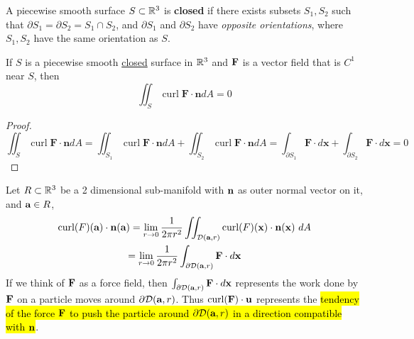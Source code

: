 \documentclass[11pt]{article}
\newcommand{\veF}[0]{\ve{F}}
\begin{document}
			\begin{definition}
				A piecewise smooth surface $S \subset \mathbb{R}^3$ is \textbf{closed} if there exists subsets $S_1, S_2$ such that $\partial S_1 = \partial S_2 = S_1 \cap S_2$, and $\partial S_1$ and $\partial S_2$ have \emph{opposite orientations}, where $S_1, S_2$ have the same orientation as $S$.
			\end{definition}
			
			\begin{theorem}
				If $S$ is a piecewise smooth \ul{closed} surface in $\mathbb{R}^3$ and $\veF$ is a vector field that is $C^1$ near $S$, then
				\begin{equation}
					\iint_{S} \operatorname{curl} \mathbf{F} \cdot \mathbf{n} d A=0
				\end{equation}
				\begin{proof}
					\begin{equation}
						\iint_{S} \operatorname{curl} \mathbf{F} \cdot \mathbf{n} d A=\iint_{S_{1}} \operatorname{curl} \mathbf{F} \cdot \mathbf{n} d A+\iint_{S_{2}} \operatorname{curl} \mathbf{F} \cdot \mathbf{n} d A=\int_{\partial S_{1}} \mathbf{F} \cdot d \mathbf{x}+\int_{\partial S_{2}} \mathbf{F} \cdot d \mathbf{x}=0
					\end{equation}
				\end{proof}
			\end{theorem}
			
			\begin{proposition}
				Let $R \subset \mathbb{R}^3$ be a 2 dimensional sub-manifold with $\textbf{n}$ as outer normal vector on it, and $\textbf{a} \in R$, 
				\begin{gather}
					\text{curl}(F)(\textbf{a}) \cdot \textbf{n}(\textbf{a}) 
					= \lim_{r \to 0} \frac{1}{2\pi r^2} \iint_{\mathcal{{D}}(\textbf{a}, r)} \text{curl}(F)(\textbf{x}) \cdot \textbf{n}(\textbf{x})\ dA \\
					= \lim_{r \to 0} \frac{1}{2\pi r^2} \int_{\partial \mathcal{{D}}(\textbf{a}, r)} \textbf{F} \cdot d\textbf{x} \\
				\end{gather}
				If we think of $\textbf{F}$ as a force field, then $\int_{\partial \mathcal{{D}}(\textbf{a}, r)} \textbf{F} \cdot d\textbf{x}$ represents the work done by $\textbf{F}$ on a particle moves around $\partial \mathcal{{D}}(\textbf{a}, r)$. Thus $\text{curl}(\textbf{F}) \cdot \textbf{u}$ represents the \hl{tendency of the force $\textbf{F}$ to push the particle around $\partial \mathcal{{D}}(\textbf{a}, r)$ in a direction compatible with $\textbf{n}$}.
			\end{proposition}
			
\end{document}
